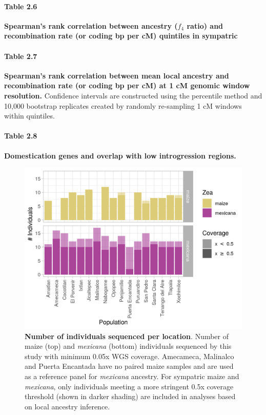 \paragraph*{Table 2.6}
\label{spearmans_rho_f4_sympatric_mexicana_pop22}
{\bf Spearman's rank correlation between ancestry ($f_4$ ratio) and recombination rate (or coding bp per cM) quintiles in sympatric \mexicana}
{}

\paragraph*{Table 2.7}
\label{spearmans_rho_local_ancestry}
{\bf Spearman's rank correlation between mean \mexicana local ancestry and recombination rate (or coding bp per cM) at 1 cM genomic window resolution.} Confidence intervals are constructed using the percentile method and 10,000 bootstrap replicates created by randomly re-sampling 1 cM windows within quintiles.


\paragraph*{Table 2.8}
\label{genes_outliers}
{\bf Domestication genes and overlap with low introgression regions.}

\newpage
\newpage


\begin{figure}[ht]
	\includegraphics[width=\textwidth]{chapter2/figures/p_seq_counts.png}
	\caption{\color{Gray} \textbf{Number of individuals sequenced per location}. Number of maize (top) and \textit{mexicana} (bottom) individuals sequenced by this study with minimum 0.05x WGS coverage. Amecameca, Malinalco and Puerta Encantada have no paired maize samples and are used as a reference panel for \textit{mexicana} ancestry. For sympatric maize and \textit{mexicana}, only individuals meeting a more stringent 0.5x coverage threshold (shown in darker shading) are included in analyses based on local ancestry inference.}
	\label{sequenced_ind_counts}
\end{figure}

